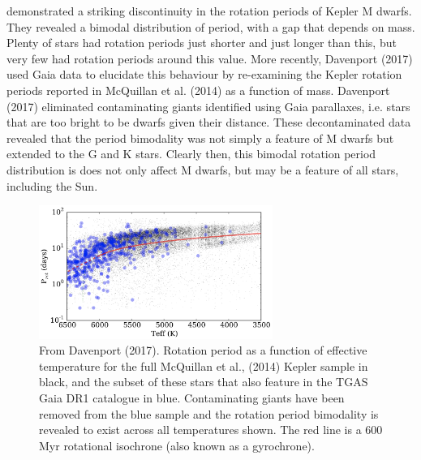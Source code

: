 \documentclass[useAMS, usenatbib, preprint, 12pt]{aastex}
\begin{document}
\citet{McQuillan2014} demonstrated a striking discontinuity in the rotation
periods of Kepler M dwarfs.
They revealed a bimodal distribution of period, with a gap that depends on
mass.
Plenty of stars had rotation periods just shorter and just longer than this,
but very few had rotation periods around this value.
More recently, Davenport (2017) used Gaia data to elucidate this behaviour by
re-examining the Kepler rotation periods reported in McQuillan et al. (2014)
as a function of mass.
Davenport (2017) eliminated contaminating giants identified using Gaia
parallaxes, i.e. stars that are too bright to be
dwarfs given their distance.
These decontaminated data revealed that the period bimodality was not simply a
feature of M dwarfs but extended to the G and K stars.
Clearly then, this bimodal rotation period distribution is does not only
affect M dwarfs, but may be a feature of all stars, including the Sun.

\begin{figure}
\begin{center}
\includegraphics[width=3in, clip=true]{Davenport.png}
\caption{From Davenport (2017).
    Rotation period as a function of effective
temperature for the full McQuillan et al., (2014) Kepler sample in black, and
the subset of these stars that also feature in the TGAS Gaia DR1 catalogue in
blue. Contaminating giants have been removed from the blue sample and the
rotation period bimodality is revealed to exist across all temperatures shown.
    The red line is a 600 Myr rotational isochrone (also known as a gyrochrone).}
\label{fig:sip_hist}
\end{center}
\end{figure}
\end{document}
